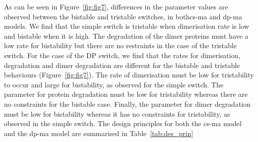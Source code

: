 As can be seen in Figure~\ref{fig:fig7}, differences in the parameter values are observed between the bistable and tristable switches, in both\acrshort{cs-ma} and \acrshort{dp-ma} models. We find that the simple switch is tristable when dimerisation rate is low and bistable when it is high. The degradation of the dimer proteins must have a low rate for bistability but there are no restraints in the case of the tristable switch. For the case of the DP switch, we find that the rates for dimerisation, degradation and dimer degradation are different for the bistable and tristable behaviours (Figure~\ref{fig:fig7}). The rate of dimerisation must be low for tristability to occur and large for bistability, as observed for the simple switch. The parameter for protein degradation must be low for tristability whereas there are no constraints for the bistable case. Finally, the parameter for dimer degradation must be low for bistability whereas it has no constraints for tristability, as observed in the simple switch. The design principles for both the \acrshort{cs-ma} model and the \acrshort{dp-ma} model are summarised in Table~\ref{tab:des_prin}



